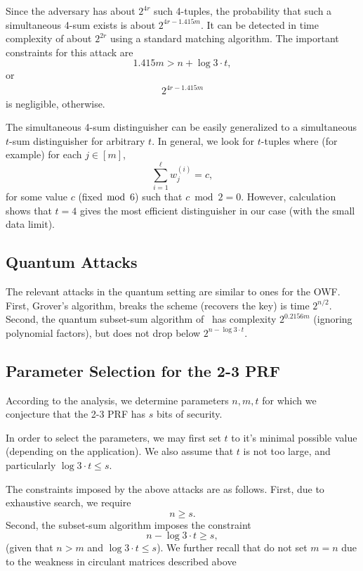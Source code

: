 \documentclass[orivec,envcountsect]{llncs}
\begin{document}
Since the adversary has about $2^{4r}$ such 4-tuples, the probability that such a simultaneous 4-sum exists is about $2^{4r - 1.415 m}$. It can be detected in time complexity of about $2^{2r}$ using a standard matching algorithm. The important constraints for this attack are
$$1.415 m > n + \log 3 \cdot t,$$ or
\begin{align}
\label{eq:sim}
2^{4r - 1.415 m} 
\end{align}
is negligible, otherwise.

The simultaneous 4-sum distinguisher can be easily generalized to a
simultaneous $t$-sum distinguisher for arbitrary $t$.
In general, we look for $t$-tuples where (for example)
for each $j \in [m]$, $$\sum_{i = 1}^{\ell} w^{(i)}_j = c,$$
for some value $c$ (fixed $\bmod$ 6) such that $c \bmod 2 = 0$.
However, calculation shows that $t = 4$ gives the most efficient
distinguisher in our case (with the small data limit).



\subsection{Quantum Attacks}

The relevant attacks in the quantum setting are similar to ones for the OWF.
First, Grover's algorithm, breaks the scheme (recovers the key) is time $2^{n/2}$.
Second, the quantum subset-sum algorithm of~\cite{BonnetainBSS20} has complexity $2^{0.2156 m}$ (ignoring polynomial factors), but does not drop below $2^{n - \log 3 \cdot t}$.


\subsection{Parameter Selection for the 2-3 PRF}


According to the analysis, we determine parameters $n,m,t$ for which
we conjecture that the 2-3 PRF has $s$ bits of security.

In order to select the parameters, we may first set $t$ to it's minimal possible value
(depending on the application).
We also assume that $t$ is not too large, and particularly $\log 3 \cdot t \leq s$.

The constraints imposed by the above attacks are as follows.
First, due to exhaustive search, we require $$n \geq s.$$
Second, the subset-sum algorithm
imposes the constraint
$$n - \log 3 \cdot t \geq s,$$
(given that $n > m$ and $\log 3 \cdot t \leq s$).
We further recall that do not set $m = n$ due to the weakness in circulant matrices described above
\end{document}
